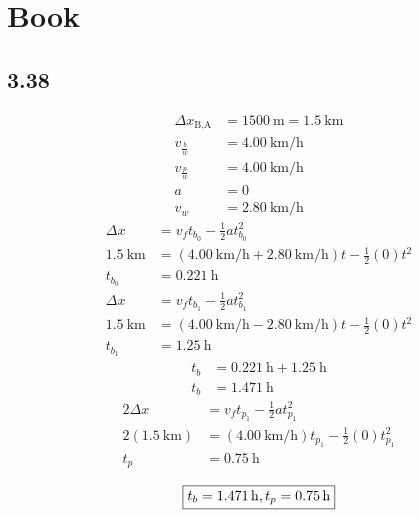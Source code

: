 \documentclass{article}
\begin{document}
\newcommand{\hr}{\par\noindent\rule{\textwidth}{0.4pt}}

\newcommand{\bc}[1]{
	\begin{equation*}
		\begin{boxed}
			{#1}
		\end{boxed}
	\end{equation*}
}

\newcommand{\cond}[2]{
	\ifmmode
		{#1} \quad {#2}
	\else
		$$ {#1} \quad {#2} $$
	\fi
}

\tableofcontents

\section{Book}

\subsection{3.38}
\begin{align*}
	\Delta x_\text{B,A} & = \SI{1500}{\meter} = \SI{1.5}{\kilo \meter} \\
	v_\frac{b}{w} & = \SI{4.00}{\kilo \meter \per \hour} \\
	v_\frac{p}{w} & = \SI{4.00}{\kilo \meter \per \hour} \\
	a & = 0 \\
	v_w & = \SI{2.80}{\kilo \meter \per \hour}
\end{align*}
\begin{align*}
	\Delta x & = v_ft_{b_0} - \frac{1}{2}at_{b_0}^2 \\
	\SI{1.5}{\kilo \meter} & = (\SI{4.00}{\kilo \meter \per \hour} + \SI{2.80}{\kilo \meter \per \hour})t - \frac{1}{2}(0)t^2 \\
	t_{b_0} & = \SI{0.221}{\hour}
\end{align*}
\begin{align*}
	\Delta x & = v_ft_{b_1} - \frac{1}{2}at_{b_1}^2 \\
	\SI{1.5}{\kilo \meter} & = (\SI{4.00}{\kilo \meter \per \hour} - \SI{2.80}{\kilo \meter \per \hour})t - \frac{1}{2}(0)t^2 \\
	t_{b_1} & = \SI{1.25}{\hour}
\end{align*}
\begin{align*}
	t_b & = \SI{0.221}{\hour} + \SI{1.25}{\hour} \\
	t_b & = \SI{1.471}{\hour}
\end{align*}
\begin{align*}
	2\Delta x & = v_ft_{p_1} - \frac{1}{2}at_{p_1}^2 \\
	2(\SI{1.5}{\kilo \meter}) & = (\SI{4.00}{\kilo \meter \per \hour})t_{p_1} - \frac{1}{2}(0)t_{p_1}^2 \\
	t_p & = \SI{0.75}{\hour}
\end{align*}
\bc{t_b = \SI{1.471}{\hour}, t_p = \SI{0.75}{\hour}}
\end{document}
